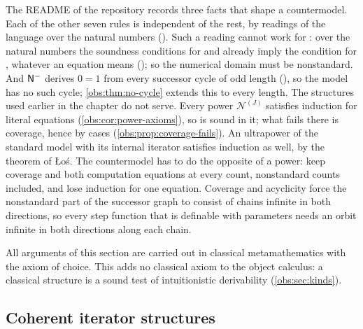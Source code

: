 The README of the repository records three facts that shape a countermodel.
Each of the other seven rules is independent of the rest, by readings of the
language over the natural numbers (). Such a reading cannot
work for : over the natural numbers the soundness conditions for
 and  already imply the condition for ,
whatever an equation means (); so the numerical
domain must be nonstandard. And $\mathsf{N}^{-}$ derives $0=1$ from every successor
cycle of odd length (), so the model has no such
cycle; \cref{obs:thm:no-cycle} extends this to every length. The structures
used earlier in the chapter do not serve. Every power $\mathcal{N}^{(J)}$
satisfies induction for literal equations (\cref{obs:cor:power-axioms}), so
 is sound in it; what fails there is coverage, hence 
by cases (\cref{obs:prop:coverage-fails}). An ultrapower of the standard model
with its internal iterator satisfies induction as well, by the theorem of
\L o\'s. The countermodel has to do the opposite of a power: keep coverage and
both computation equations at every count, nonstandard counts included, and
lose induction for one equation. Coverage and acyclicity force the nonstandard
part of the successor graph to consist of chains infinite in both directions,
so every step function that is definable with parameters needs an orbit
infinite in both directions along each chain.

All arguments of this section are carried out in classical metamathematics with
the axiom of choice. This adds no classical axiom to the object calculus: a
classical structure is a sound test of intuitionistic derivability
(\cref{obs:sec:kinds}).

\subsection{Coherent iterator structures}


